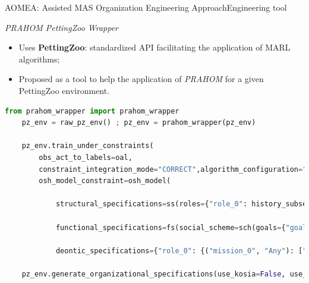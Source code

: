 \begin{frame}[fragile]{AOMEA: Assisted MAS Organization Engineering Approach}{Engineering tool}

    \begin{block}{\emph{PRAHOM PettingZoo Wrapper}\label{PettingZoo-wrapper}}
        \begin{itemize}
            \item Uses \textbf{PettingZoo}: standardized API facilitating the application of MARL algorithms;
            \item Proposed as a tool to help the application of \emph{PRAHOM} for a given PettingZoo environment.
        \end{itemize}
    \end{block}

    \begin{lstlisting}[language=Python,basicstyle=\scriptsize]
    from prahom_wrapper import prahom_wrapper
    pz_env = raw_pz_env() ; pz_env = prahom_wrapper(pz_env)
    
    pz_env.train_under_constraints(
        obs_act_to_labels=oal,
        constraint_integration_mode="CORRECT",algorithm_configuration="default_MAPPO"
        osh_model_constraint=osh_model(
            
            structural_specifications=ss(roles={"role_0": history_subset(pattern="[o0,a1](1,4),[o1,a2](1,2)")},role_inheritance_relations=None, root_groups=None),
            
            functional_specifications=fs(social_scheme=sch(goals={"goal_0": history_subset(pattern="[#Any](0,*),[obs_goal_0]")},missions=["mission_0"], goals_structure=None,mission_to_goals={"mission_0": ["goal_0"]},mission_to_agent_cardinality=None),social_preferences=None),

            deontic_specifications={"role_0": {("mission_0", "Any"): ["agent_0", "agent_4"]}}))

    pz_env.generate_organizational_specifications(use_kosia=False, use_gosia=True,gosia_configuration={"generate_figures": True})
    \end{lstlisting}

\end{frame}
